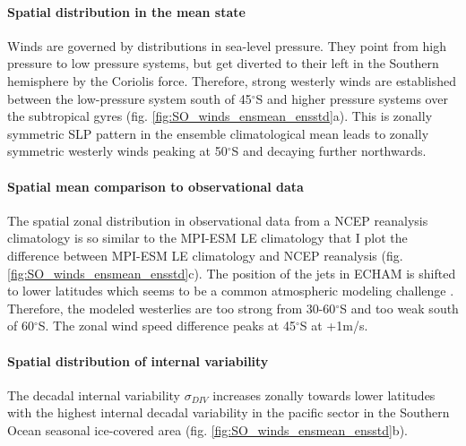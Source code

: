 \documentclass[12pt]{article}
\begin{document}
\paragraph{Spatial distribution in the mean state}
Winds are governed by distributions in sea-level pressure. They point from high pressure to low pressure systems, but get diverted to their left in the Southern hemisphere by the Coriolis force. Therefore, strong westerly winds are established between the low-pressure system south of 45$^\circ$S and higher pressure systems over the subtropical gyres (fig. \ref{fig:SO_winds_ensmean_ensstd}a). This is zonally symmetric SLP pattern in the ensemble climatological mean leads to zonally symmetric westerly winds peaking at 50$^\circ$S and decaying further northwards.

\paragraph{Spatial mean comparison to observational data}
The spatial zonal distribution in observational data from a NCEP reanalysis climatology is so similar to the MPI-ESM LE climatology that I plot the difference between MPI-ESM LE climatology and NCEP reanalysis \citep{Kalnay1996} (fig. \ref{fig:SO_winds_ensmean_ensstd}c). The position of the jets in ECHAM is shifted to lower latitudes \citep{Stevens2013} which seems to be a common atmospheric modeling challenge \citep{Kidston2010}. Therefore, the modeled westerlies are too strong from 30-60$^\circ$S and too weak south of 60$^\circ$S. The zonal wind speed difference peaks at 45$^\circ$S at +1m/s. 

\paragraph{Spatial distribution of internal variability} 
The decadal internal variability $\sigma_{DIV}$ increases zonally towards lower latitudes with the highest internal decadal variability in the pacific sector in the Southern Ocean seasonal ice-covered area (fig. \ref{fig:SO_winds_ensmean_ensstd}b).
\end{document}
